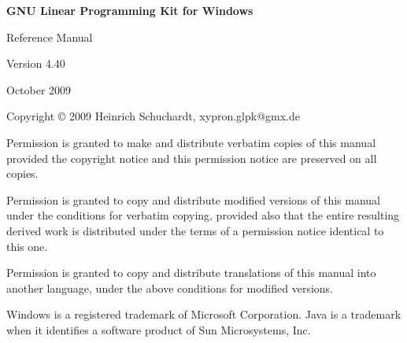 \documentclass[a4paper,11pt]{report}
\begin{document}
\thispagestyle{empty}

\begin{center}

\vspace*{1in}

\begin{huge}
\sf\bfseries GNU Linear Programming Kit\linebreak
for Windows
\end{huge}

\vspace{0.5in}

\begin{LARGE}
\sf Reference Manual
\end{LARGE}

\vspace{0.5in}

\begin{LARGE}
\sf Version 4.40
\end{LARGE}

\vspace{0.5in}
\begin{Large}
\sf October 2009
\end{Large}
\end{center}

\newpage

\vspace*{1in}

\vfill

\medskip \noindent
Copyright \copyright{} 2009 Heinrich Schuchardt, xypron.glpk@gmx.de

\medskip \noindent
Permission is granted to make and distribute verbatim copies of this
manual provided the copyright notice and this permission notice are
preserved on all copies.

\medskip \noindent
Permission is granted to copy and distribute modified versions of this
manual under the conditions for verbatim copying, provided also that the
entire resulting derived work is distributed under the terms of
a permission notice identical to this one.

\medskip \noindent
Permission is granted to copy and distribute translations of this manual
into another language, under the above conditions for modified versions.

\medskip \noindent
Windows is a registered trademark of Microsoft Corporation. Java is a 
trademark when it identifies a software product of Sun Microsystems, Inc.

\tableofcontents
\end{document}
